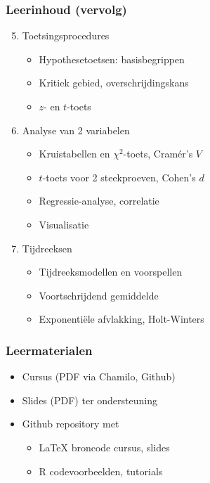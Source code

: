 \documentclass[aspectratio=169]{beamer}
\begin{document}
\begin{frame}
\frametitle{Leerinhoud (vervolg)}

  \begin{enumerate}
    \setcounter{enumi}{4}
    \item Toetsingsprocedures
    \begin{itemize}
      \item Hypothesetoetsen: basisbegrippen
      \item Kritiek gebied, overschrijdingskans
      \item $z$- en $t$-toets
    \end{itemize}
    \item Analyse van 2 variabelen
    \begin{itemize}
      \item Kruistabellen en $\chi^2$-toets, Cramér's $V$
      \item $t$-toets voor 2 steekproeven, Cohen's $d$
      \item Regressie-analyse, correlatie
      \item Visualisatie
    \end{itemize}
    \item Tijdreeksen
    \begin{itemize}
      \item Tijdreeksmodellen en voorspellen
      \item Voortschrijdend gemiddelde
      \item Exponentiële afvlakking, Holt-Winters
    \end{itemize}
  \end{enumerate}
\end{frame}

\begin{frame}
  \frametitle{Leermaterialen}

  \begin{itemize}
    \item Cursus (PDF via Chamilo, Github)
    \item Slides (PDF) ter ondersteuning
    \item Github repository met
    \begin{itemize}
      \item \LaTeX{} broncode cursus, slides
      \item R codevoorbeelden, tutorials
    \end{itemize}
  \end{itemize}    

\end{frame}
\end{document}
